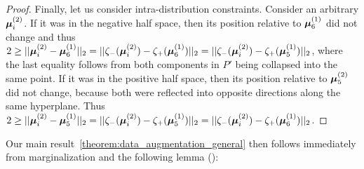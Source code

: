 \begin{proof}
    Finally, let us consider intra-distribution constraints.
    Consider an arbitrary ${\bm{\mu}}^{(2)}_i$.
    If it was in the negative half space, then its position relative to ${\bm{\mu}}^{(1)}_6$ did not change and thus
    $2 \geq ||{\bm{\mu}}^{(2)}_i - {\bm{\mu}}^{(1)}_6||_2 = ||\zeta_-({\bm{\mu}}^{(2)}_i) - \zeta_+({\bm{\mu}}^{(1)}_6)||_2 =
    ||\zeta_-({\bm{\mu}}^{(2)}_i) - \zeta_+({\bm{\mu}}^{(1)}_5)||_2$, where the last equality follows from both components in $P'$ being collapsed into the same point.
    If it was in the positive half space, then its position relative to ${\bm{\mu}}^{(2)}_5$ did not change, because both were reflected into opposite directions along the same hyperplane. Thus
    $2 \geq ||{\bm{\mu}}^{(2)}_i - {\bm{\mu}}^{(1)}_5||_2 = ||\zeta_-({\bm{\mu}}^{(2)}_i) - \zeta_+({\bm{\mu}}^{(1)}_5)||_2 =
    ||\zeta_-({\bm{\mu}}^{(2)}_i) - \zeta_+({\bm{\mu}}^{(1)}_6)||_2$.
    \fi
\end{proof}
Our main result~\cref{theorem:data_augmentation_general} then follows immediately from marginalization
and the following lemma (\cite{zhu2022optimal}):
\dominatingpairalphasymmetry*